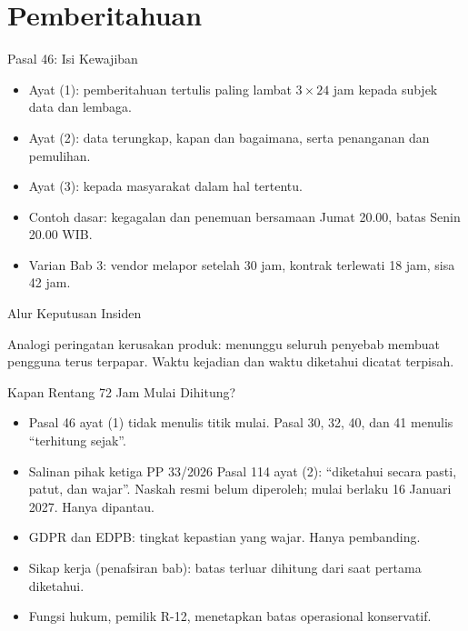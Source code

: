\documentclass[aspectratio=169, table, 12pt]{beamer}
\begin{document}
\section{Pemberitahuan}

\begin{frame}{{\Large Pasal 46: Isi Kewajiban}}
  \vspace{6pt}
  \small
  \begin{itemize}
    \item Ayat (1): pemberitahuan tertulis paling lambat $3 \times 24$ jam kepada subjek data
          dan lembaga.
    \item Ayat (2): data terungkap, kapan dan bagaimana, serta penanganan dan pemulihan.
    \item Ayat (3): kepada masyarakat dalam hal tertentu.
    \item Contoh dasar: kegagalan dan penemuan bersamaan Jumat 20.00, batas Senin 20.00 WIB.
    \item Varian Bab 3: vendor melapor setelah 30 jam, kontrak terlewati 18 jam, sisa 42 jam.
  \end{itemize}
\end{frame}

\begin{frame}{{\Large Alur Keputusan Insiden}}
  \vspace{16pt}
  \begin{center}
    \resizebox{0.9\textwidth}{!}{}
  \end{center}
  \vspace{10pt}
  \small Analogi peringatan kerusakan produk: menunggu seluruh penyebab membuat pengguna terus
  terpapar. Waktu kejadian dan waktu diketahui dicatat terpisah.
\end{frame}

\begin{frame}{{\Large Kapan Rentang 72 Jam Mulai Dihitung?}}
  \vspace{6pt}
  \small
  \begin{itemize}
    \item Pasal 46 ayat (1) tidak menulis titik mulai. Pasal 30, 32, 40, dan 41 menulis ``terhitung
          sejak''.
    \item Salinan pihak ketiga PP 33/2026 Pasal 114 ayat (2): ``diketahui secara pasti, patut, dan
          wajar''. Naskah resmi belum diperoleh; mulai berlaku 16 Januari 2027. Hanya dipantau.
    \item GDPR dan EDPB: tingkat kepastian yang wajar. Hanya pembanding.
    \item Sikap kerja (penafsiran bab): batas terluar dihitung dari saat pertama diketahui.
    \item Fungsi hukum, pemilik R-12, menetapkan batas operasional konservatif.
  \end{itemize}
\end{frame}
\end{document}
